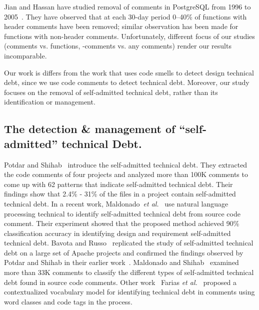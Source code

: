 Jian and Hassan have studied removal of comments in PostgreSQL from 1996 to 2005~\cite{Jiang:Hassan}. They have observed that at each 30-day period 0--40\% of functions with header comments have been removed; similar observation has been made for functions with non-header comments. Unfortunately, different focus of our studies (comments vs. functions, \SATD-comments vs. any comments) render our results incomparable.


Our work is differs from the work that uses code smells to detect design technical debt, since we use code comments to detect technical debt. Moreover, our study focuses on the removal of self-admitted technical debt, rather than its identification or management.




\subsection{The detection \& management of ``self-admitted'' technical Debt.} Potdar and Shihab~\cite{Potdar2014ICSME} introduce the self-admitted technical debt. They extracted the code comments of four projects and analyzed more than 100K comments to come up with 62  patterns that indicate self-admitted technical debt. Their findings show that 2.4\% - 31\% of the files in a project contain self-admitted technical debt. In a recent work, Maldonado~\textit{et al.}~\cite{Maldonado2015TSE} use natural language processing technical to identify self-admitted technical debt from source code comment. Their experiment showed that the proposed method achieved 90\% classification accuracy in identifying design and requirement self-admitted technical debt. Bavota and Russo~\cite{Bavota2016MSR} replicated the study of self-admitted technical debt on a large set of Apache  projects and confirmed the findings observed by Potdar and Shihab in their earlier work~\cite{Potdar2014ICSME}. Maldonado and Shihab~\cite{Maldonado2015MTD} examined more than 33K comments to classify the different types of self-admitted technical debt found in source code comments. Other work~ Farias \textit{et al.}~\cite{Farias2015MTD} proposed a contextualized vocabulary model for identifying technical debt in comments using word classes and code tags in the process.



